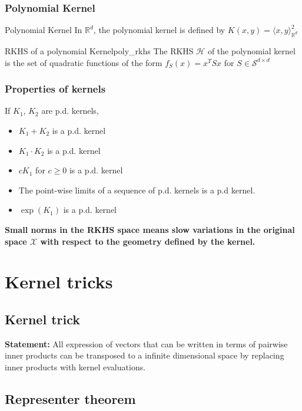 \documentclass{article}
\begin{document}
\subsubsection{Polynomial Kernel}

\begin{Definition}{Polynomial Kernel}{}
  In $\mathbb{R}^d$, the polynomial kernel is defined by $K(x, y) = \langle x, y 
  \rangle_{\mathbb{R}^d}^2$
\end{Definition}

\begin{Theorem}{RKHS of a polynomial Kernel}{poly_rkhs}
  The RKHS $\mathcal{H}$ of the polynomial kernel is the set of quadratic 
  functions of the form $f_S(x) = x^T S x$ for $S \in \mathcal{S}^{d\times d}$ 
\end{Theorem}

\subsubsection{Properties of kernels} 

If $K_1$, $K_2$ are p.d. kernels, 
\begin{itemize}
  \item $K_1 + K_2$ is a p.d. kernel
  \item $K_1\cdot K_2$ is a p.d. kernel
  \item $cK_1$ for $c\geq 0$ is a p.d. kernel
  \item The point-wise limits of a sequence of p.d. kernels is a p.d kernel.
  \item $\exp(K_1)$ is a p.d. kernel
\end{itemize}

\textbf{Small norms in the RKHS space means slow variations in the original
space $\mathcal{X}$ with respect to the geometry defined by the kernel.}
\section{Kernel tricks}

\subsection{Kernel trick}
\textbf{Statement:} All expression of vectors that can be written in terms of 
pairwise inner products can be transposed to a infinite dimensional space by 
replacing inner products with kernel evaluations. 

\subsection{Representer theorem}
\end{document}
